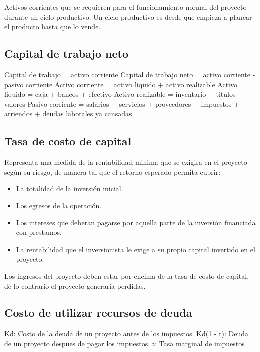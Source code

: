 \documentclass[a4paper, 11pt, oneside]{article}
\begin{document}
Activos corrientes que se requieren para el funcionamiento normal del proyecto durante un ciclo productivo. Un ciclo productivo es desde que empieza
a planear el producto hasta que lo vende.

\subsection{Capital de trabajo neto}

Capital de trabajo = activo corriente \newline
Capital de trabajo neto = activo corriente - pasivo corriente \newline
Activo corriente = activo liquido + activo realizable \newline
Activo liquido = caja + bancos + efectivo \newline
Activo realizable = inventario + titulos valores \newline
Pasivo corriente = salarios + servicios + proveedores + impuestos + arriendos + deudas laborales ya causadas

\subsection{Tasa de costo de capital}

Representa una medida de la rentabilidad minima que se exigira en el proyecto según su riesgo, de manera tal que el retorno esperado permita cubrir: 

\begin{itemize}
	\item La totalidad de la inversión inicial.
	\item Los egresos de la operación.
	\item Los intereses que deberan pagarse por aquella parte de la inversión financiada con prestamos.
	\item La rentabilidad que el inversionista le exige a su propio capital invertido en el proyecto. 
\end{itemize}

Los ingresos del proyecto deben estar por encima de la tasa de costo de capital, de lo contrario el proyecto generaria perdidas.  

\subsection{Costo de utilizar recursos de deuda}

Kd: Costo de la deuda de un proyecto antes de los impuestos.
Kd(1 - t): Deuda de un proyecto despues de pagar los impuestos.
t: Tasa marginal de impuestos
\end{document}
